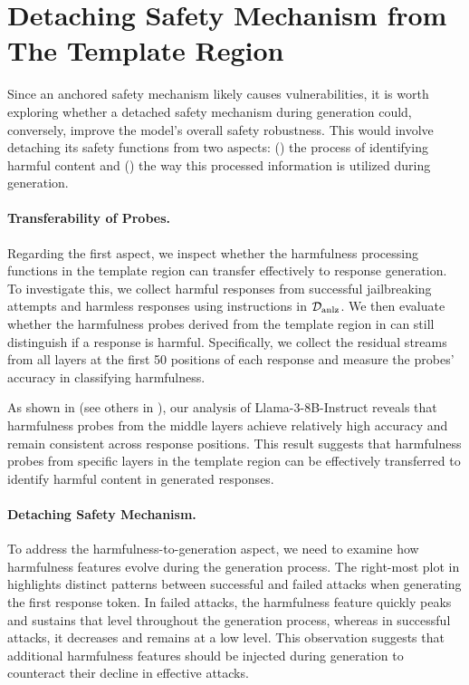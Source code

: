 \section{Detaching Safety Mechanism from The Template Region}
\label{sec:rq3}

Since an anchored safety mechanism likely causes vulnerabilities, it is worth exploring whether a detached safety mechanism during generation could, conversely, improve the model's overall safety robustness. This would involve detaching its safety functions from two aspects: () the process of identifying harmful content and () the way this processed information is utilized during generation.


\paragraph{Transferability of Probes.} 
Regarding the first aspect, we inspect whether the harmfulness processing functions in the template region can transfer effectively to response generation. 
To investigate this, we collect harmful responses from successful jailbreaking attempts and harmless responses using instructions in \({\mathcal{D}}_{\text{anlz}} \). We then evaluate whether the harmfulness probes derived from the template region in  can still distinguish if a response is harmful.
Specifically, we collect the residual streams from all layers at the first 50 positions of each response and measure the probes' accuracy in classifying harmfulness.



 As shown in  (see others in ), our analysis of Llama-3-8B-Instruct reveals that harmfulness probes from the middle layers achieve relatively high accuracy and remain consistent across response positions. This result suggests that harmfulness probes from specific layers in the template region can be effectively transferred to identify harmful content in generated responses. 





\paragraph{Detaching Safety Mechanism.} 

To address the harmfulness-to-generation aspect, we need to examine how harmfulness features evolve during the generation process. The right-most plot in  highlights distinct patterns between successful and failed attacks when generating the first response token. In failed attacks, the harmfulness feature quickly peaks and sustains that level throughout the generation process, whereas in successful attacks, it decreases and remains at a low level.
This observation suggests that additional harmfulness features should be injected during generation to counteract their decline in effective attacks. 

